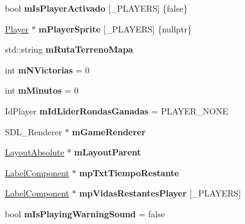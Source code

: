 \begin{DoxyCompactItemize}
\item 
bool {\bfseries m\+Is\+Player\+Activado} \mbox{[}\+\_\+\+P\+L\+A\+Y\+E\+RS\mbox{]} \{false\}\hypertarget{class_juego_a2b5fd9e927e73d550e56ae52b3b5f137}{}\label{class_juego_a2b5fd9e927e73d550e56ae52b3b5f137}

\item 
\hyperlink{class_player}{Player} $\ast$ {\bfseries m\+Player\+Sprite} \mbox{[}\+\_\+\+P\+L\+A\+Y\+E\+RS\mbox{]} \{nullptr\}\hypertarget{class_juego_a6cc0ada2c2041381f84d20843d3e48c7}{}\label{class_juego_a6cc0ada2c2041381f84d20843d3e48c7}

\item 
std\+::string {\bfseries m\+Ruta\+Terreno\+Mapa}\hypertarget{class_juego_ad3a003e0b425815cf01f62277322c6da}{}\label{class_juego_ad3a003e0b425815cf01f62277322c6da}

\item 
int {\bfseries m\+N\+Victorias} = 0\hypertarget{class_juego_ab46d0960968802293c69df8a67309a2f}{}\label{class_juego_ab46d0960968802293c69df8a67309a2f}

\item 
int {\bfseries m\+Minutos} = 0\hypertarget{class_juego_ae8c84e5470394b4908659a53e16679c2}{}\label{class_juego_ae8c84e5470394b4908659a53e16679c2}

\item 
Id\+Player {\bfseries m\+Id\+Lider\+Rondas\+Ganadas} = P\+L\+A\+Y\+E\+R\+\_\+\+N\+O\+NE\hypertarget{class_juego_a8d39c10569fa9c1aa8b0cd66989b3d43}{}\label{class_juego_a8d39c10569fa9c1aa8b0cd66989b3d43}

\item 
S\+D\+L\+\_\+\+Renderer $\ast$ {\bfseries m\+Game\+Renderer}\hypertarget{class_juego_a2dfe5021b437c332a7f5d553502fc9d0}{}\label{class_juego_a2dfe5021b437c332a7f5d553502fc9d0}

\item 
\hyperlink{class_layout_absolute}{Layout\+Absolute} $\ast$ {\bfseries m\+Layout\+Parent}\hypertarget{class_juego_aeac2fc35554cf89683dac4193fc972f9}{}\label{class_juego_aeac2fc35554cf89683dac4193fc972f9}

\item 
\hyperlink{class_label_component}{Label\+Component} $\ast$ {\bfseries mp\+Txt\+Tiempo\+Restante}\hypertarget{class_juego_adda3a8d16fa4706e29da1aee43e92679}{}\label{class_juego_adda3a8d16fa4706e29da1aee43e92679}

\item 
\hyperlink{class_label_component}{Label\+Component} $\ast$ {\bfseries mp\+Vidas\+Restantes\+Player} \mbox{[}\+\_\+\+P\+L\+A\+Y\+E\+RS\mbox{]}\hypertarget{class_juego_a0f8cf53b8d5c8415a8b0c41d9c056c90}{}\label{class_juego_a0f8cf53b8d5c8415a8b0c41d9c056c90}

\item 
bool {\bfseries m\+Is\+Playing\+Warning\+Sound} = false\hypertarget{class_juego_ae07f25bd4865e8892951171f582dc707}{}\label{class_juego_ae07f25bd4865e8892951171f582dc707}

\end{DoxyCompactItemize}
